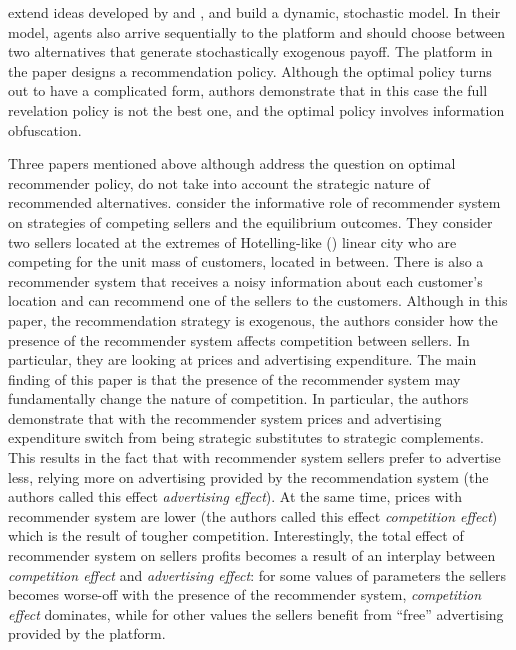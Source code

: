 \documentclass[a4paper]{article}
\begin{document}
	
	
	
	\cite{papanastasiou2017} extend ideas developed by \cite{kremer2014} and \cite{che2015}, and build a dynamic, stochastic model. In their model, agents also arrive sequentially to the platform and should choose between two alternatives that generate stochastically exogenous payoff. The platform in the paper designs a recommendation policy. Although the optimal policy turns out to have a complicated form, authors demonstrate that in this case the full revelation policy is not the best one, and the optimal policy involves information obfuscation.
	
	Three papers mentioned above although address the question on optimal recommender policy, do not take into account the strategic nature of recommended alternatives.
	\cite{chen2016advertising} consider the informative role of recommender system on strategies of competing sellers and the equilibrium outcomes. They consider two sellers located at the extremes of Hotelling-like (\cite{harold1929stability}) linear city who are competing for the unit mass of customers, located in between. There is also a recommender system that receives a noisy information about each customer's location and can recommend one of the sellers to the customers. Although in this paper, the recommendation strategy is exogenous, the authors consider how the presence of the recommender system affects competition between sellers. In particular, they are looking at prices and advertising expenditure. The main finding of this paper is that the presence of the recommender system may fundamentally change the nature of competition. In particular, the authors demonstrate that with the recommender system prices and advertising expenditure switch from being strategic substitutes to strategic complements. This results in the fact that with recommender system sellers prefer to advertise less, relying more on advertising provided by the recommendation system (the authors called this effect \textit{advertising effect}). At the same time, prices with recommender system are lower (the authors called this effect \textit{competition effect}) which is the result of tougher competition. Interestingly, the total effect of recommender system on sellers profits becomes a result of an interplay between \textit{competition effect} and \textit{advertising effect}: for some values of parameters the sellers becomes worse-off with the presence of the recommender system, \textit{competition effect} dominates, while for other values the sellers benefit from ``free'' advertising provided by the platform.
	
\end{document}
